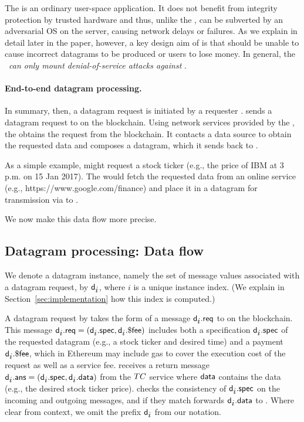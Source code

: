 The \medname is an ordinary user-space application. It does not benefit from integrity protection by trusted hardware and thus, unlike the \encname, can be subverted by an adversarial OS on the \tc server, causing network delays or failures. As we explain in detail later in the paper, however, a key design aim of \tc is that \medname should be unable to cause incorrect datagrams to be produced or users to lose money. In general, the \medname~{\em can only mount denial-of-service attacks against \tc}. 

\paragraph{End-to-end datagram processing.}
In summary, then, a datagram request is initiated by a requester \reqcont. \reqcont sends a datagram request to \tcont on the blockchain. Using network services provided by the \medname, the \encname obtains the request from the blockchain. It contacts a data source to obtain the requested data and composes a datagram, which it sends back to \reqcont.

As a simple example, \reqcont might request a stock ticker  (e.g., the price of IBM at 3 p.m. on 15 Jan 2017). The \encname would fetch the requested data from an online service (e.g., https://www.google.com/finance) and place it in a datagram for transmission via \tcont to \reqcont.


We now make this data flow more precise. 

\subsection{Datagram processing: Data flow}

We denote a datagram instance, namely the set of message values associated with a datagram request, by ${\sf d_{\mbox{$i$}}}$, where $i$ is a unique instance index. (We explain in Section~\ref{sec:implementation} how this index is computed.) 

A datagram request by \reqcont takes the form of a message ${\sf d_{\mbox{$i$}}}.{\sf req}$ to \tcont on the blockchain. This message ${\sf d_{\mbox{$i$}}}.{\sf req} = ({\sf d_{\mbox{$i$}}}.{\sf spec}, {\sf d_{\mbox{$i$}}}.{\sf \$fee})$ includes both a specification ${\sf d_{\mbox{$i$}}}.{\sf spec}$ of the requested datagram (e.g., a stock ticker and desired time) and a payment ${\sf d_{\mbox{$i$}}}.{\sf \$fee}$, which in Ethereum may include gas to cover the execution cost of the request as well as a service fee. \tcont receives a return message ${\sf d_{\mbox{$i$}}}.{\sf ans} = ({\sf d_{\mbox{$i$}}}.{\sf spec}, {\sf d_{\mbox{$i$}}}.{\sf data})$ from the $TC$ service where ${\sf data}$ contains the data (e.g., the desired stock ticker price). \tcont checks the consistency of ${\sf d_{\mbox{$i$}}}.{\sf spec}$ on the incoming and outgoing messages, and if they match forwards ${\sf d_{\mbox{$i$}}}.{\sf data}$ to \reqcont. Where clear from context, we omit the prefix ${\sf d_{\mbox{$i$}}}$ from our notation.

